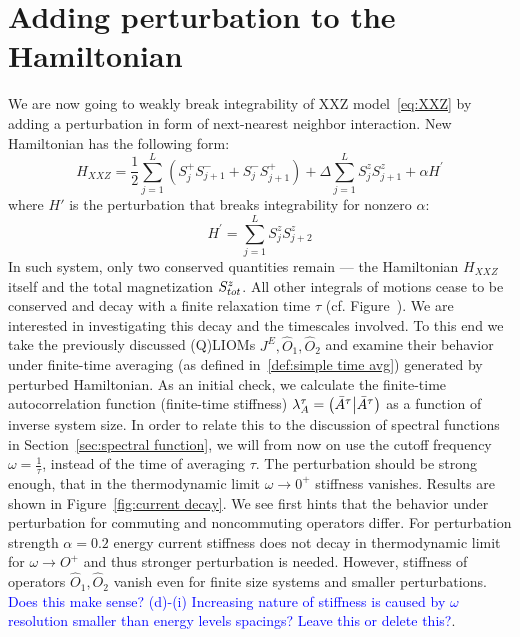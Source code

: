 \section{Adding perturbation to the Hamiltonian}
We are now going to weakly break integrability of XXZ model~\eqref{eq:XXZ} 
by adding a perturbation in form of next-nearest neighbor interaction.
New Hamiltonian has the following form:
\begin{equation}
    H_{XXZ} = \frac{1}{2}\sum_{j = 1}^{L}\left( S^{+}_{j} S^{-}_{j+1} + 
    S^{-}_{j}S^{+}_{j+1} \right) + \Delta\sum_{j = 1}^{L} S^{z}_{j}S^{z}_{j+1}
    + \alpha H^{\prime}
    \label{eq:HXXZ perturbed}
\end{equation}
where \(H'\) is the perturbation that breaks integrability for nonzero \(\alpha \):
\begin{equation}
    H^{\prime}=\sum_{j = 1}^{L} S^{z}_{j}S^{z}_{j+2}
    \label{eq:perturbation}
\end{equation}
In such system, only two conserved quantities remain --- the Hamiltonian \(H_{XXZ}\) itself 
and the total magnetization \(S^{z}_{tot}\). All other integrals of motions cease to be conserved
and decay with a finite relaxation time \(\tau\) (cf. Figure~).
We are interested in investigating this decay and the timescales involved.
To this end we take the previously discussed (Q)LIOMs \(J^E, \hat{O}_1,\hat{O}_2\)
and examine their behavior under finite-time averaging 
(as defined in~\eqref{def:simple time avg}) generated by perturbed Hamiltonian.
As an initial check, we calculate the finite-time autocorrelation function (finite-time stiffness)
\(\lambda^{\tau}_A = \left(\bar{A}^{\tau} \middle| \bar{A}^{\tau}\right)\) as a function of inverse system size.
In order to relate this to the discussion of spectral functions in Section~\ref{sec:spectral function},
we will from now on use the cutoff frequency \(\omega = \frac{1}{\tau}\), instead of the time of
averaging \(\tau\). The perturbation should be strong enough, that in the thermodynamic limit
\(\omega \to 0^+\) stiffness vanishes. Results are shown in Figure~\ref{fig:current decay}.
We see first hints that the behavior under perturbation for commuting and noncommuting operators
differ. For perturbation strength \(\alpha=0.2\) energy current stiffness does
not decay in thermodynamic limit for \(\omega \to O^+\) and thus stronger perturbation is needed.
However, stiffness of operators \(\hat{O}_1,\hat{O}_2\) vanish even for finite size systems
and smaller perturbations. 
\textcolor{blue}{Does this make sense? (d)-(i) Increasing nature of
stiffness is caused by \(\omega\) resolution smaller than energy levels spacings? Leave this or
delete this?}.
